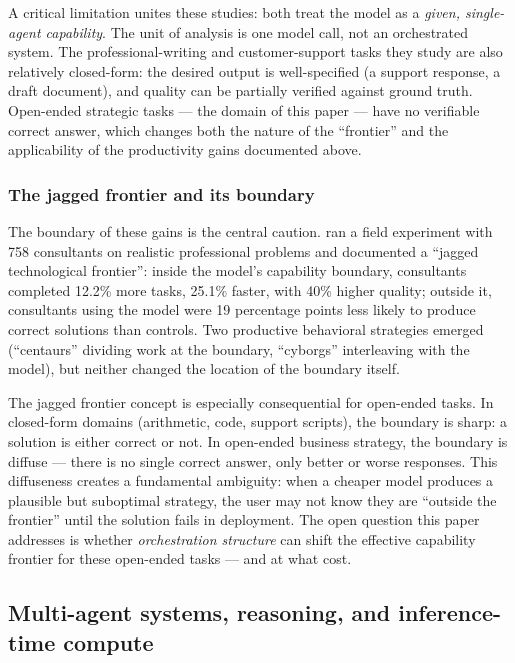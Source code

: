 \documentclass[12pt,a4paper]{article}
\begin{document}
A critical limitation unites these studies: both treat the model as a
\emph{given, single-agent capability}. The unit of analysis is one model call,
not an orchestrated system. The professional-writing and customer-support tasks
they study are also relatively closed-form: the desired output is
well-specified (a support response, a draft document), and quality can be
partially verified against ground truth. Open-ended strategic tasks --- the
domain of this paper --- have no verifiable correct answer, which changes both
the nature of the ``frontier'' and the applicability of the productivity gains
documented above.

\subsubsection{The jagged frontier and its boundary}

The boundary of these gains is the central caution. \citet{DellAcquaEtAl2023}
ran a field experiment with 758 consultants on realistic professional problems
and documented a ``jagged technological frontier'': inside the model's
capability boundary, consultants completed 12.2\% more tasks, 25.1\% faster,
with 40\% higher quality; outside it, consultants using the model were 19
percentage points less likely to produce correct solutions than controls. Two
productive behavioral strategies emerged (``centaurs'' dividing work at the
boundary, ``cyborgs'' interleaving with the model), but neither changed the
location of the boundary itself.

The jagged frontier concept is especially consequential for open-ended tasks.
In closed-form domains (arithmetic, code, support scripts), the boundary is
sharp: a solution is either correct or not. In open-ended business strategy,
the boundary is diffuse --- there is no single correct answer, only better or
worse responses. This diffuseness creates a fundamental ambiguity: when a cheaper
model produces a plausible but suboptimal strategy, the user may not know they
are ``outside the frontier'' until the solution fails in deployment. The open
question this paper addresses is whether \emph{orchestration structure} can
shift the effective capability frontier for these open-ended tasks --- and at
what cost.

\subsection{Multi-agent systems, reasoning, and inference-time compute}
\end{document}
